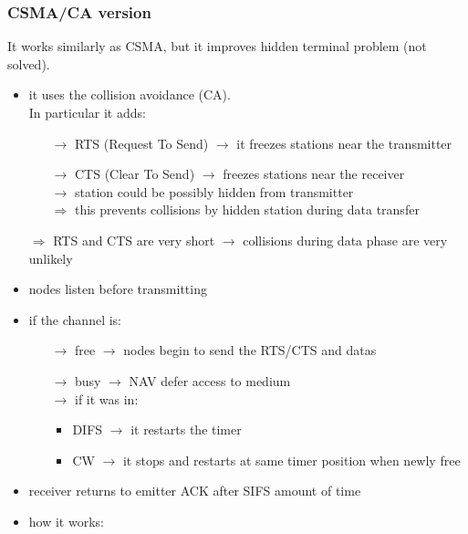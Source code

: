 \subsubsection{CSMA/CA version}
It works similarly as CSMA, but it improves hidden terminal problem (not solved).
\begin{itemize}
    \item it uses the collision avoidance (CA).\\[0.2cm]
    In particular it adds:
    \begin{itemize}
        \item[$\rightarrow$] RTS (Request To Send) $\rightarrow$ it freezes stations near the transmitter
        \item[$\rightarrow$] CTS (Clear To Send) $\rightarrow$ freezes stations near the receiver\\
        $\rightarrow$ station could be possibly hidden from transmitter\\
        $\Rightarrow$ this prevents collisions by hidden station during data transfer
    \end{itemize}
    $\Rightarrow$ RTS and CTS are very short $\rightarrow$ collisions during data phase are
    very unlikely
    \item nodes listen before transmitting
    \newpage
    \item if the channel is:
    \begin{itemize}
        \item[$\rightarrow$] free $\rightarrow$ nodes begin to send the RTS/CTS and datas 
        \item[$\rightarrow$] busy $\rightarrow$ NAV defer access to medium\\
        \hspace*{0.75cm}$\rightarrow$ if it was in:
        \begin{itemize}
            \vspace{-0.1cm}\item DIFS $\rightarrow$ it restarts the timer
            \vspace{-0.1cm}\item CW $\rightarrow$ it stops and restarts at same timer position when newly free
        \end{itemize}
    \end{itemize}
    \item receiver returns to emitter ACK after SIFS amount of time
    \item how it works:
    \begin{enumerate}

\end{enumerate}
\end{itemize}
